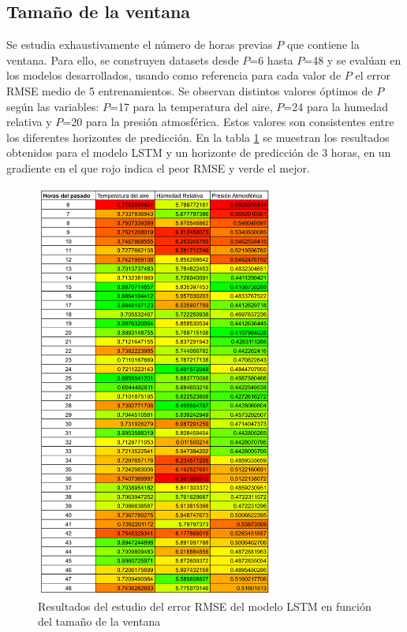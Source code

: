 \subsection{Tamaño de la ventana}
Se estudia exhaustivamente el número de horas previas $P$ que contiene la ventana. Para ello, se construyen datasets desde $P$=6 hasta $P$=48 y se evalúan en los modelos 
desarrollados, usando como referencia para cada valor de $P$ el error RMSE medio de 5 entrenamientos. Se observan distintos valores óptimos de $P$ según las variables: $P$=17 para la temperatura del aire, $P$=24 para la humedad relativa y 
$P$=20 para la presión atmosférica. Estos valores son consistentes entre los diferentes horizontes de predicción. En la tabla \ref{window_size} se muestran los resultados obtenidos para el modelo LSTM y un horizonte de predicción de 3 horas,
en un gradiente en el que rojo indica el peor RMSE y verde el mejor.

\begin{figure}[H]
    \centering
    \includegraphics[width=0.7\textwidth]{images/past_window_size.png}
    \caption{Resultados del estudio del error RMSE del modelo LSTM en función del tamaño de la ventana }
    \label{window_size}
\end{figure}

